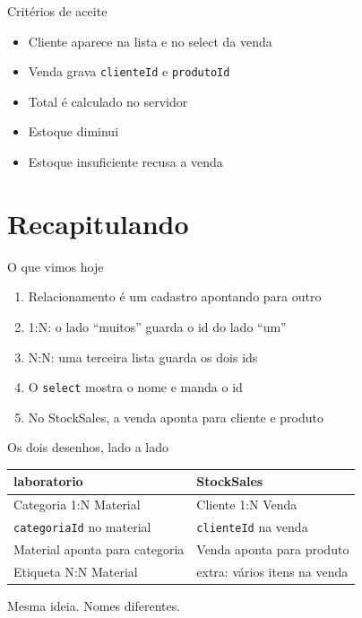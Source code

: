 \documentclass[aspectratio=169,11pt]{beamer}
\begin{document}
\begin{frame}{Critérios de aceite}
  \begin{itemize}
    \item [ ] Cliente aparece na lista e no select da venda
    \item [ ] Venda grava \texttt{clienteId} e \texttt{produtoId}
    \item [ ] Total é calculado no servidor
    \item [ ] Estoque diminui
    \item [ ] Estoque insuficiente recusa a venda
  \end{itemize}
\end{frame}

\section{Recapitulando}

\begin{frame}{O que vimos hoje}
  \begin{enumerate}
    \item Relacionamento é um cadastro apontando para outro
    \item 1{:}N: o lado ``muitos'' guarda o id do lado ``um''
    \item N{:}N: uma terceira lista guarda os dois ids
    \item O \texttt{select} mostra o nome e manda o id
    \item No StockSales, a venda aponta para cliente e produto
  \end{enumerate}
\end{frame}

\begin{frame}{Os dois desenhos, lado a lado}
  \begin{center}
  \begin{tabular}{ll}
    \toprule
    laboratorio & StockSales \\
    \midrule
    Categoria 1{:}N Material & Cliente 1{:}N Venda \\
    \texttt{categoriaId} no material & \texttt{clienteId} na venda \\
    Material aponta para categoria & Venda aponta para produto \\
    Etiqueta N{:}N Material & extra: vários itens na venda \\
    \bottomrule
  \end{tabular}
  \end{center}

  \vspace{0.6em}
  Mesma ideia. Nomes diferentes.
\end{frame}
\end{document}
